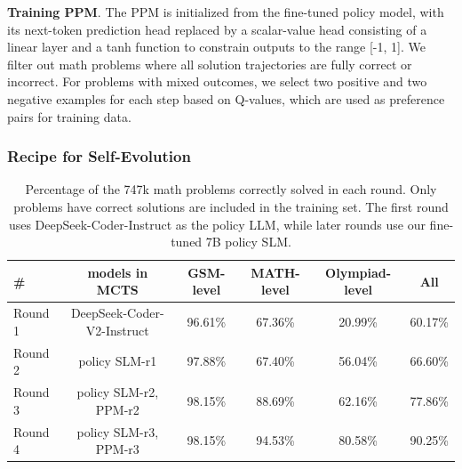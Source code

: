 \noindent\textbf{Training PPM}. The PPM is initialized from the fine-tuned policy model, with its next-token prediction head replaced by a scalar-value head consisting of  a linear layer and a tanh function to constrain outputs to the range [-1, 1].  We filter out math problems where all solution trajectories are fully correct or incorrect.   For problems with mixed outcomes, we select two positive and two negative examples for each step based on Q-values, which are used as preference pairs for  training data.




\subsubsection{Recipe for Self-Evolution}

\vspace{-1ex}
\begin{table}[hpt]
	\small 
	\centering
	\caption{Percentage of the 747k math problems  correctly solved in each round. Only problems have correct solutions are included in the  training set.   The first round uses DeepSeek-Coder-Instruct as the policy LLM, while later rounds use our fine-tuned 7B policy SLM.}
	\label{tbl:solveratio}
		\begin{tabular}
			{lccccc}
			\toprule
			\#&models in MCTS&GSM-level&MATH-level&Olympiad-level &All\\
			\midrule 
			Round 1&DeepSeek-Coder-V2-Instruct &96.61\%&67.36\% & 20.99\% & 60.17\%\\
			Round 2 &policy SLM-r1&97.88\%& 67.40\%& 56.04\% &66.60\%\\
			Round 3&policy SLM-r2, PPM-r2 &98.15\%& 88.69\%& 62.16\%&77.86\%\\
			Round 4&policy SLM-r3, PPM-r3 &98.15\%&94.53\% &80.58\% &90.25\%\\
			\hline
	\end{tabular}%
		\vspace{-1ex}
\end{table}

